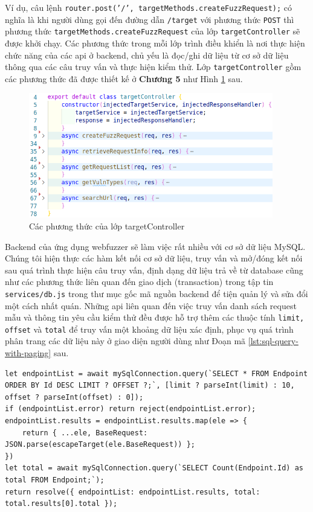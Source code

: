 Ví dụ, câu lệnh \colorbox{gray!30}{\texttt{router.post('/', targetMethods.createFuzzRequest);}} có nghĩa là khi người dùng gọi đến đường dẫn \texttt{/target} với phương thức \texttt{POST} thì phương thức \texttt{targetMethods.createFuzzRequest} của lớp \texttt{targetController} sẽ được khởi chạy. Các phương thức trong mỗi lớp trình điều khiển là nơi thực hiện chức năng của các \acrshort{api} ở backend, chủ yếu là đọc/ghi dữ liệu từ cơ sở dữ liệu thông qua các câu truy vấn và thực hiện kiểm thử. Lớp \texttt{targetController} gồm các phương thức đã được thiết kế ở \textbf{Chương 5} như Hình \ref{fig:implement-target-controller-class} sau.
\begin{figure}[H]
  \centering
    \includegraphics[width=0.95\textwidth,keepaspectratio=true]{images/implement-target-controller-class.png}
  \caption{Các phương thức của lớp targetController}
  \label{fig:implement-target-controller-class}
\end{figure}
Backend của ứng dụng webfuzzer sẽ làm việc rất nhiều với cơ sở dữ liệu MySQL. Chúng tôi hiện thực các hàm kết nối cơ sở dữ liệu, truy vấn và mở/đóng kết nối sau quá trình thực hiện câu truy vấn, định dạng dữ liệu trả về từ database cũng như các phương thức liên quan đến giao dịch (transaction) trong tập tin \texttt{services/db.js} trong thư mục gốc mã nguồn backend để tiện quản lý và sửa đổi một cách nhất quán. Những \acrshort{api} liên quan đến việc truy vấn danh sách request mẫu và thông tin yêu cầu kiểm thử đều được hỗ trợ thêm các thuộc tính \texttt{limit, offset} và \texttt{total} để truy vấn một khoảng dữ liệu xác định, phục vụ quá trình phân trang các dữ liệu này ở giao diện người dùng như Đoạn mã \ref{lst:sql-query-with-paging} sau.
\begin{lstlisting}[style=ES6, label={lst:sql-query-with-paging}, caption={\acrshort{api} truy vấn danh sách request mẫu có hỗ trợ phân trang}]
let endpointList = await mySqlConnection.query(`SELECT * FROM Endpoint ORDER BY Id DESC LIMIT ? OFFSET ?;`, [limit ? parseInt(limit) : 10, offset ? parseInt(offset) : 0]);
if (endpointList.error) return reject(endpointList.error);
endpointList.results = endpointList.results.map(ele => {
    return { ...ele, BaseRequest: JSON.parse(escapeTarget(ele.BaseRequest)) };
})
let total = await mySqlConnection.query(`SELECT Count(Endpoint.Id) as total FROM Endpoint;`);
return resolve({ endpointList: endpointList.results, total: total.results[0].total });
\end{lstlisting}
